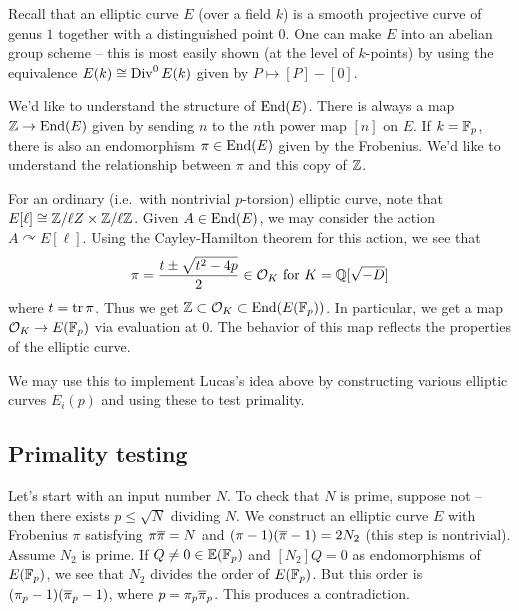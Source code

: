 \documentclass{amsart}
\begin{document}
Recall that an elliptic curve $E$ (over a field $k$) is a smooth projective curve of genus $1$ together with a distinguished point $0$.
One can make $E$ into an abelian group scheme -- this is most easily shown (at the level of $k$-points) by using the equivalence $E(k) \cong \operatorname{Div}^0 E(k)$ given by $P \mapsto [P] - [0]$.

We'd like to understand the structure of $\operatorname{End}(E)$.
There is always a map $\mathbb{Z} \to \operatorname{End}(E)$ given by sending $n$ to the $n$th power map $[n]$ on $E$.
If $k = \mathbb{F}_p$, there is also an endomorphism $\pi \in \operatorname{End}(E)$ given by the Frobenius.
We'd like to understand the relationship between $\pi$ and this copy of $\mathbb{Z}$.

For an ordinary (i.e.\ with nontrivial $p$-torsion) elliptic curve, note that $E[\ell] \cong \mathbb{Z} / \ell Z \times \mathbb{Z} / \ell \mathbb{Z}$.
Given $A \in \operatorname{End}(E)$, we may consider the action $A \curvearrowright E[\ell]$.
Using the Cayley-Hamilton theorem for this action, we see that
\[
	\pi = \frac{t \pm \sqrt{t^2 - 4p}}{2} \in \mathcal{O}_K \textrm{ for } K = \mathbb{Q}[\sqrt{-D}]
\]
where $t = \operatorname{tr} \pi$.
Thus we get $\mathbb{Z} \subset \mathcal{O}_K \subset \operatorname{End}(E(\mathbb{F}_p))$.
In particular, we get a map $\mathcal{O}_K \to E(\mathbb{F}_p)$ via evaluation at $0$.
The behavior of this map reflects the properties of the elliptic curve.

We may use this to implement Lucas's idea above by constructing various elliptic curves $E_i(p)$ and using these to test primality.

\subsection{Primality testing}

Let's start with an input number $N$.
To check that $N$ is prime, suppose not -- then there exists $p \leq \sqrt{N}$ dividing $N$.
We construct an elliptic curve $E$ with Frobenius $\pi$ satisfying $\pi \overline{\pi} = N$ and $(\pi - 1)(\overline{\pi} - 1) = 2 N_2$ (this step is nontrivial).
Assume $N_2$ is prime.
If $Q \neq 0 \in \mathbb{E}(\mathbb{F}_p)$ and $[N_2] Q = 0$ as endomorphisms of $E(\mathbb{F}_p)$, we see that $N_2$ divides the order of $E(\mathbb{F}_p)$.
But this order is $(\pi_p - 1)(\overline{\pi}_p - 1)$, where $p = \pi_p \overline{\pi}_p$.
This produces a contradiction.
\end{document}
